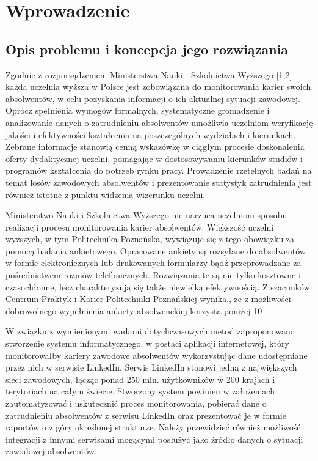 \chapter{Wprowadzenie}
\label{Chapter1}

\section{Opis problemu i koncepcja jego rozwiązania}
\label{Chapter11}

Zgodnie z rozporządzeniem Ministerstwa Nauki i Szkolnictwa Wyższego [1,2] każda uczelnia wyższa w Polsce jest zobowiązana do monitorowania karier swoich absolwentów, w celu pozyskania informacji o ich aktualnej sytuacji zawodowej. Oprócz spełnienia wymogów formalnych, systematyczne gromadzenie i analizowanie danych o zatrudnieniu absolwentów umożliwia uczelniom weryfikację jakości i efektywności kształcenia na poszczególnych wydziałach i kierunkach. Zebrane informacje stanowią cenną wskazówkę w ciągłym procesie doskonalenia oferty dydaktycznej uczelni, pomagając w dostosowywaniu kierunków studiów i programów kształcenia do potrzeb rynku pracy. Prowadzenie rzetelnych badań na temat losów zawodowych absolwentów i prezentowanie statystyk zatrudnienia jest również istotne z punktu widzenia wizerunku uczelni.

Ministerstwo Nauki i Szkolnictwa Wyższego nie narzuca uczelniom sposobu realizacji procesu monitorowania karier absolwentów. Większość uczelni wyższych, w tym Politechnika Poznańska, wywiązuje się z tego obowiązku za pomocą badania ankietowego. Opracowane ankiety są rozsyłane do absolwentów w formie elektronicznych lub drukowanych formularzy bądź przeprowadzane za pośrednictwem rozmów telefonicznych. Rozwiązania te są nie tylko kosztowne i czasochłonne, lecz charakteryzują się także niewielką efektywnością. Z szacunków Centrum Praktyk i Karier Politechniki Poznańskiej wynika,, że z możliwości dobrowolnego wypełnienia ankiety absolwenckiej korzysta poniżej 10%

W związku z wymienionymi wadami dotychczasowych metod zaproponowano stworzenie systemu informatycznego, w postaci aplikacji internetowej, który monitorowałby kariery zawodowe absolwentów wykorzystując dane udostępniane przez nich w serwisie LinkedIn. Serwis LinkedIn stanowi jedną z największych sieci zawodowych, łącząc ponad 250 mln. użytkowników w 200 krajach i terytoriach na całym świecie. Stworzony system powinien w założeniach zautomatyzować i uskutecznić proces monitorowania, pobierać dane o zatrudnieniu absolwentów z serwisu LinkedIn oraz prezentować je w formie raportów o z góry określonej strukturze. Należy przewidzieć również możliwość integracji z innymi serwisami mogącymi posłużyć jako źródło danych o sytuacji zawodowej absolwentów.

